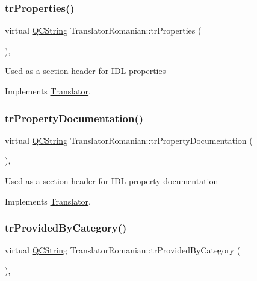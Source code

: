 \subsubsection{\texorpdfstring{trProperties()}{trProperties()}}
{\footnotesize\ttfamily virtual \mbox{\hyperlink{class_q_c_string}{Q\+C\+String}} Translator\+Romanian\+::tr\+Properties (\begin{DoxyParamCaption}{ }\end{DoxyParamCaption})\hspace{0.3cm}{\ttfamily [inline]}, {\ttfamily [virtual]}}

Used as a section header for I\+DL properties 

Implements \mbox{\hyperlink{class_translator}{Translator}}.

\mbox{\label{class_translator_romanian_ab50afc61cdd4cd805987f558c29d45e1}} 
\subsubsection{\texorpdfstring{trPropertyDocumentation()}{trPropertyDocumentation()}}
{\footnotesize\ttfamily virtual \mbox{\hyperlink{class_q_c_string}{Q\+C\+String}} Translator\+Romanian\+::tr\+Property\+Documentation (\begin{DoxyParamCaption}{ }\end{DoxyParamCaption})\hspace{0.3cm}{\ttfamily [inline]}, {\ttfamily [virtual]}}

Used as a section header for I\+DL property documentation 

Implements \mbox{\hyperlink{class_translator}{Translator}}.

\mbox{\label{class_translator_romanian_a0adb4edf516aa09ddc81c9345c4f85d7}} 
\subsubsection{\texorpdfstring{trProvidedByCategory()}{trProvidedByCategory()}}
{\footnotesize\ttfamily virtual \mbox{\hyperlink{class_q_c_string}{Q\+C\+String}} Translator\+Romanian\+::tr\+Provided\+By\+Category (\begin{DoxyParamCaption}{ }\end{DoxyParamCaption})\hspace{0.3cm}{\ttfamily [inline]}, {\ttfamily [virtual]}}

